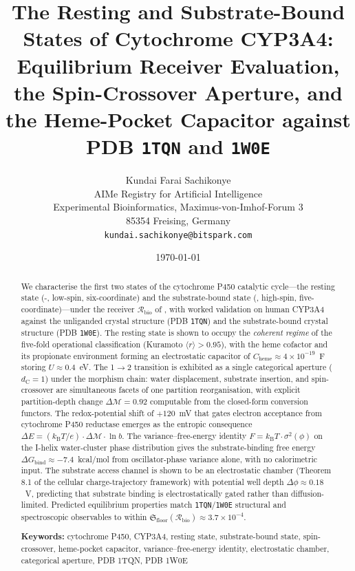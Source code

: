 \documentclass[11pt,twocolumn,a4paper]{article}
\title{\textbf{The Resting and Substrate-Bound States of Cytochrome CYP3A4:\\
Equilibrium Receiver Evaluation, the Spin-Crossover Aperture, and the Heme-Pocket Capacitor against PDB \texttt{1TQN} and \texttt{1W0E}}}
\author{
Kundai Farai Sachikonye\\[0.3em]
AIMe Registry for Artificial Intelligence\\
Experimental Bioinformatics, Maximus-von-Imhof-Forum 3\\
85354 Freising, Germany\\
\texttt{kundai.sachikonye@bitspark.com}
}
\date{\today}
\theoremstyle{definition}
\theoremstyle{remark}
\newcommand{\kB}{k_{\mathrm{B}}}
\newcommand{\Recv}{\mathcal{R}}
\newcommand{\Floor}{\mathfrak{S}_{\mathrm{floor}}}
\newcommand{\depth}{\mathcal{M}}
\newcommand{\dC}{d_{\mathrm{C}}}
\newcommand{\orderpar}{\langle r \rangle}
\begin{document}
\maketitle

\begin{abstract}
We characterise the first two states of the cytochrome P450 catalytic cycle---the resting state (-, low-spin, six-coordinate) and the substrate-bound state (, high-spin, five-coordinate)---under the receiver $\Recv_{\mathrm{bio}}$ of \citep{sachikonye2025_paper1}, with worked validation on human CYP3A4 against the unliganded crystal structure (PDB \texttt{1TQN}) and the substrate-bound crystal structure (PDB \texttt{1W0E}). The resting state is shown to occupy the \emph{coherent regime} of the five-fold operational classification (Kuramoto $\orderpar > 0.95$), with the heme cofactor and its propionate environment forming an electrostatic capacitor of $C_{\mathrm{heme}} \approx 4 \times 10^{-19}$~F storing $U \approx 0.4$~eV. The 1$\to$2 transition is exhibited as a single categorical aperture ($\dC = 1$) under the morphism chain: water displacement, substrate insertion, and spin-crossover are simultaneous facets of one partition reorganisation, with explicit partition-depth change $\Delta\depth = 0.92$ computable from the closed-form conversion functors. The redox-potential shift of $+120$~mV that gates electron acceptance from cytochrome P450 reductase emerges as the entropic consequence $\Delta E = (\kB T / e) \cdot \Delta\depth \cdot \ln b$. The variance--free-energy identity $F = \kB T \cdot \sigma^2(\phi)$ on the I-helix water-cluster phase distribution gives the substrate-binding free energy $\Delta G_{\mathrm{bind}} \approx -7.4$~kcal/mol from oscillator-phase variance alone, with no calorimetric input. The substrate access channel is shown to be an electrostatic chamber (Theorem 8.1 of the cellular charge-trajectory framework) with potential well depth $\Delta\phi \approx 0.18$~V, predicting that substrate binding is electrostatically gated rather than diffusion-limited. Predicted equilibrium properties match \texttt{1TQN}/\texttt{1W0E} structural and spectroscopic observables to within $\Floor(\Recv_{\mathrm{bio}}) \approx 3.7 \times 10^{-4}$.

\medskip
\noindent\textbf{Keywords:} cytochrome P450, CYP3A4, resting state, substrate-bound state, spin-crossover, heme-pocket capacitor, variance--free-energy identity, electrostatic chamber, categorical aperture, PDB 1TQN, PDB 1W0E
\end{abstract}
\end{document}
